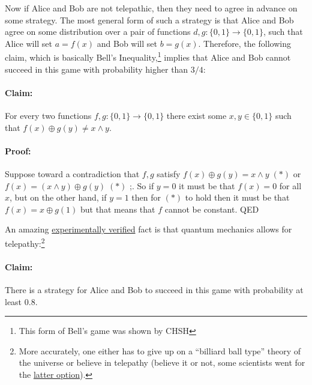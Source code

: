 Now if Alice and Bob are not telepathic, then they need to agree in
advance on some strategy. The most general form of such a strategy is
that Alice and Bob agree on some distribution over a pair of functions
\(d,g:\{0,1\}\rightarrow\{0,1\}\), such that Alice will set \(a=f(x)\)
and Bob will set \(b=g(x)\). Therefore, the following claim, which is
basically Bell's Inequality,\footnote{This form of Bell's game was shown
  by CHSH} implies that Alice and Bob cannot succeed in this game with
probability higher than \(3/4\):

\paragraph{Claim:} For every two functions
\(f,g:\{0,1\}\rightarrow\{0,1\}\) there exist some \(x,y\in\{0,1\}\)
such that \(f(x) \oplus g(y) \neq x \wedge y\).

\paragraph{Proof:} Suppose toward a contradiction that \(f,g\) satisfy
\(f(x) \oplus g(y) = x \wedge y \;(*)\) or
\(f(x) = (x \wedge y) \oplus g(y)\;(*)\) ;. So if \(y=0\) it must be
that \(f(x)=0\) for all \(x\), but on the other hand, if \(y=1\) then
for \((*)\) to hold then it must be that \(f(x) = x \oplus g(1)\) but
that means that \(f\) cannot be constant. QED

An amazing \href{http://arxiv.org/abs/1508.05949}{experimentally
verified} fact is that quantum mechanics allows for
telepathy:\footnote{More accurately, one either has to give up on a
  ``billiard ball type'' theory of the universe or believe in telepathy
  (believe it or not, some scientists went for the
  \href{https://en.wikipedia.org/wiki/Superdeterminism}{latter option}).}

\paragraph{Claim:} There is a strategy for Alice and Bob to succeed in
this game with probability at least \(0.8\).

